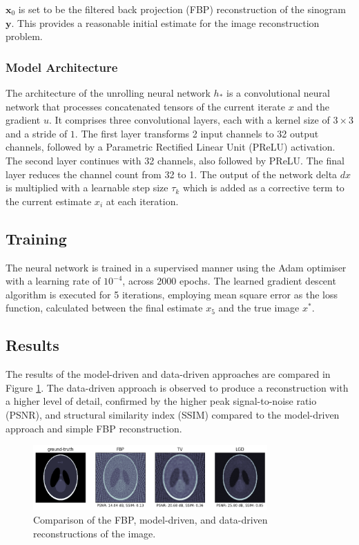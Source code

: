 \documentclass[11pt]{article}
\begin{document}
\( \mathbf{x}_0 \) is set to be the filtered back projection (FBP) reconstruction of the sinogram \( \mathbf{y} \). This provides a reasonable initial estimate for the image reconstruction problem.

\subsubsection{Model Architecture}
The architecture of the unrolling neural network \( h_* \) is a convolutional neural network that processes concatenated tensors of the current iterate $x$ and the gradient $u$. It comprises three convolutional layers, each with a kernel size of $3 \times 3$ and a stride of $1$. The first layer transforms 2 input channels to 32 output channels, followed by a Parametric Rectified Linear Unit (PReLU) activation. The second layer continues with 32 channels, also followed by PReLU. The final layer reduces the channel count from 32 to 1. The output of the network delta $dx$ is multiplied with a learnable step size $\tau_k$ which is added as a corrective term to the current estimate $x_i$ at each iteration.
\subsection{Training}
The neural network is trained in a supervised manner using the Adam optimiser with a learning rate of $10^{-4}$, across 2000 epochs. The learned gradient descent algorithm is executed for 5 iterations, employing mean square error as the loss function, calculated between the final estimate $x_5$ and the true image $x^*$.

\subsection{Results}
The results of the model-driven and data-driven approaches are compared in Figure \ref{fig:reconstruction_comparison}. The data-driven approach is observed to produce a reconstruction with a higher level of detail, confirmed by the higher peak signal-to-noise ratio (PSNR), and structural similarity index (SSIM) compared to the model-driven approach and simple FBP reconstruction. 

\begin{figure}[H]
    \centering
    \includegraphics[width=0.8\textwidth]{figs/q3_2_results.png}
    \caption{Comparison of the FBP, model-driven, and data-driven reconstructions of the image.}
    \label{fig:reconstruction_comparison}
\end{figure}
\end{document}
